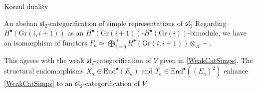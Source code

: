 \documentclass[12pt]{amsart}
\theoremstyle{definition}
\theoremstyle{remark}
\theoremstyle{remark}
\begin{document}
\begin{section}{Koszul duality}
\begin{subsection}{An abelian $\mathfrak{sl}_{2}$-categorification of simple representations of $\mathfrak{sl}_{2}$}
Regarding $H^{\bullet}(\text{Gr}(i,i+1))$ as an $H^{\bullet}(\text{Gr}(i+1))\text{-}H^{\bullet}(\text{Gr}(i))$-bimodule, we have an isomorphism of functors $F_{a}  \simeq \bigoplus_{i=0}^{n} H^{\bullet}(\text{Gr}(i,i+1)) \otimes_{A} -$.

This agrees with the weak $\mathfrak{sl}_{2}$-categorification of $V$ given in \ref{WeakCatSimps}. The structural endomorphisms $X_{a} \in \text{End}^{\bullet}(E_{a})$ and $T_{a} \in \text{End}^{\bullet}((E_{a})^{2})$ enhance \ref{WeakCatSimps} to an $\mathfrak{sl}_{2}$-categorification of $V$.

\end{subsection}

\end{section}

 

\end{document}
